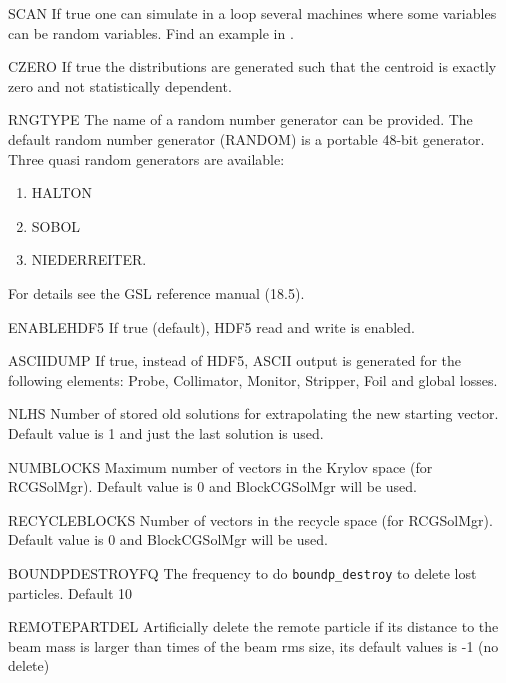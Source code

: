 \begin{kdescription}
  \item[SCAN]
  If true one can simulate in a loop several machines where some variables can be random variables. Find an
  example in .

  \item[CZERO]
  If true the distributions are generated such that the centroid is exactly zero and not statistically dependent.

  \item[RNGTYPE]
  The name  of a random number generator can be provided. The default random number generator (RANDOM) is a portable 48-bit generator. Three quasi random generators are available:
  \begin{enumerate}
    \item HALTON
    \item SOBOL
    \item NIEDERREITER.
  \end{enumerate}
  For details see the GSL reference manual (18.5).

  \item[ENABLEHDF5]
  If true (default), HDF5 read and write is enabled.

  \item[ASCIIDUMP]
  If true, instead of HDF5, ASCII output is generated for the following elements: Probe, Collimator, Monitor, Stripper, Foil and global losses.

  \item[NLHS]
  Number of stored old solutions for extrapolating the new starting vector. Default value is 1 and just the last solution is used.

  \item[NUMBLOCKS]
  Maximum number of vectors in the Krylov space (for RCGSolMgr). Default value is 0 and BlockCGSolMgr will be used.

  \item[RECYCLEBLOCKS]
  Number of vectors in the recycle space (for RCGSolMgr). Default value is 0 and BlockCGSolMgr will be used.

  \item[BOUNDPDESTROYFQ]
  The frequency to do \texttt{boundp\_destroy} to delete lost particles. Default 10

  \item[REMOTEPARTDEL]
 \sloppy Artificially delete the remote particle if its distance to the beam mass is larger than  times of the beam rms size, its default values is -1 (no delete)


\end{kdescription}
